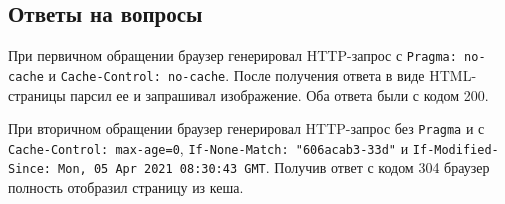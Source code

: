 \begin{center}
\end{center}

\subsection{Ответы на вопросы}

При первичном обращении браузер генерировал HTTP-запрос с
\texttt{Pragma: no-cache} и \texttt{Cache-Control: no-cache}.
После получения ответа в виде HTML-страницы парсил ее и запрашивал изображение.
Оба ответа были с кодом 200.

При вторичном обращении браузер генерировал HTTP-запрос без
\texttt{Pragma} и с \texttt{Cache-Control: max-age=0},
\texttt{If-None-Match: "606acab3-33d"} и
\texttt{If-Modified-Since: Mon, 05 Apr 2021 08:30:43 GMT}.
Получив ответ с кодом 304 браузер полность отобразил страницу из кеша.
